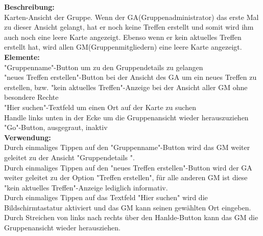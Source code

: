 \textbf{Beschreibung:}\\
Karten-Ansicht der Gruppe. Wenn der GA(Gruppenadministrator) das erste Mal zu dieser Ansicht gelangt, hat er noch keine Treffen erstellt und somit wird ihm auch noch eine leere Karte angezeigt. Ebenso wenn er kein aktuelles Treffen erstellt hat, wird allen GM(Gruppenmitgliedern) eine leere Karte angezeigt.\\
\textbf{Elemente:}\\
"Gruppenname"-Button um zu den Gruppendetails zu gelangen\\
"neues Treffen erstellen"-Button bei der Ansicht des GA um ein neues Treffen zu erstellen, bzw. "kein aktuelles Treffen"-Anzeige bei der Ansicht aller GM ohne besondere Rechte\\
"Hier suchen"-Textfeld um einen Ort auf der Karte zu suchen\\
Handle links unten in der Ecke um die Gruppenansicht wieder herauszuziehen\\
"Go"-Button, ausgegraut, inaktiv\\
\textbf{Verwendung:}\\
Durch einmaliges Tippen auf den "Gruppenname"-Button wird das GM weiter geleitet zu der Ansicht "Gruppendetails ".\\
Durch einmaliges Tippen auf den "neues Treffen erstellen"-Button wird der GA weiter geleitet zu der Option "Treffen erstellen", für alle anderen GM ist diese "kein aktuelles Treffen"-Anzeige lediglich informativ.\\
Durch einmaliges Tippen auf das Textfeld "Hier suchen" wird die Bildschirmtastatur aktiviert und das GM kann seinen gewählten Ort eingeben.\\
Durch Streichen von links nach rechts über den Hanlde-Button kann das GM die Gruppenansicht wieder herausziehen.
\newpage

